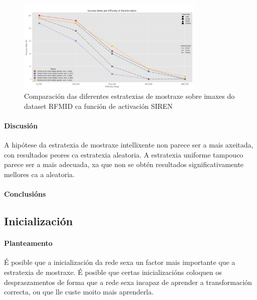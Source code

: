 \begin{figure}[ht]
    \centering
    \includegraphics[width=0.8\textwidth]{imaxes/muestraje/experiment_plot_RFMID_SIREN_RvsU.png}
    \caption{Comparación das diferentes estratexias de mostraxe sobre imaxes do dataset RFMID ca función de activación SIREN}
    \label{fig:sampling_comparison_SIREN}
\end{figure}



\paragraph{Discusión}
\label{par:Discusion-sampling}

A hipótese da estratexia de mostraxe intellixente non parece ser a mais axeitada, con resultados peores ca estratexia aleatoria. 
A estratexia uniforme tampouco parece ser a mais adecuada, xa que non se obtén resultados significativamente mellores ca a aleatoria.


\paragraph{Conclusións}
\label{par:Conclusions-sampling}

\subsection{Inicialización}
\label{subsec:Inicialización}

\paragraph{Planteamento}
\label{par:Planteamento-initialization}

É posible que a inicialización da rede sexa un factor mais importante que a estratexia de mostraxe. É posible que certas inicializacións coloquen os despraszamentos de forma que a rede sexa incapaz de aprender a transformación correcta, ou que lle custe moito mais aprenderla.

